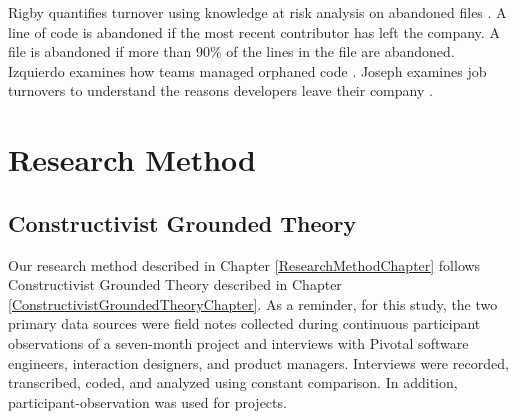Rigby quantifies turnover using knowledge at risk analysis on abandoned files  \cite{Rigby2016Turnover}. A line of code is abandoned if the most recent contributor has left the company.  A file is abandoned if more than 90\% of the lines in the file are abandoned.  Izquierdo examines how teams managed orphaned code \cite{Izquierdo2009Turnover}. Joseph examines job turnovers to understand the reasons developers leave their company  \cite{Joseph2007Turnover}.  

\section{Research Method}
\label{SustainableSoftwareDevelopmentResearchMethod}
\subsection{Constructivist Grounded Theory}




Our research method described in Chapter \ref{ResearchMethodChapter} follows Constructivist Grounded Theory described in Chapter \ref{ConstructivistGroundedTheoryChapter}. As a reminder, for this  study, the two primary data sources were field notes collected during continuous participant observations of a seven-month project and interviews with Pivotal software engineers, interaction designers, and product managers. Interviews were recorded, transcribed, coded, and analyzed using constant comparison. In addition, participant-observation was used for \numberOfObservedProjects{} projects.

